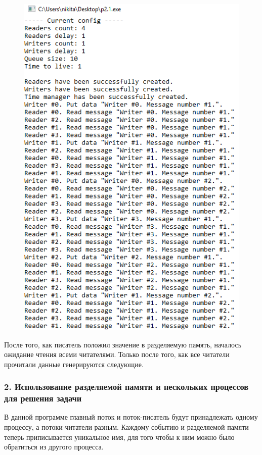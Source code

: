 \documentclass[14pt,a4paper,report]{report}
\begin{document}
\begin{figure}[h!]
	\centering
	\includegraphics[scale = 0.72]{images/p2_1.png}
	
	\caption{}
	\label{image:13}
\end{figure}

После того, как писатель положил значение в разделяемую память, началось ожидание чтения всеми читателями. Только после того, как все читатели прочитали данные генерируются следующие.

\subsubsection{2. Использование разделяемой памяти и нескольких процессов для решения задачи}

В данной программе главный поток и поток-писатель будут принадлежать одному процессу, а потоки-читатели разным. Каждому событию и разделяемой памяти теперь приписывается уникальное имя, для того чтобы к ним можно было обратиться из другого процесса.
\end{document}
